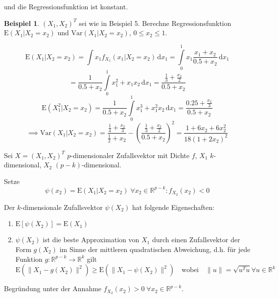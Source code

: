 \documentclass[12pt, a4paper]{article}
\newcommand{\E}{\mbox{I\negthinspace E}}
\theoremstyle{plain}
\theoremstyle{definition}
\newtheorem{beispiel}[thm]{Beispiel}
\newcommand{\R}{\mathbb{R}}
\newcommand{\1}{\mathds{1}}
\renewcommand{\E}{\mathrm{E}}
\newcommand{\Var}{\mathrm{Var}}
\providecommand{\norm}[1]{\lVert#1\rVert}
\renewcommand{\d}{\,\mathrm{d}}
\providecommand{\mtext}[1]{\quad \text{#1} \quad}
\begin{document}
und die Regressionsfunktion ist konstant.

\begin{beispiel}$(X_1, X_2)^T$ sei wie in Beispiel 5. Berechne Regressionsfunktion $\E(X_1 | X_2 = x_2)$ und $\Var(X_1| X_2 = x_2)$, $0 \leq x_2 \leq 1$.\end{beispiel}

\[ \E(X_1|X_2 = x_2) = \int x_1 f_{X_1} (x_1 | X_2 = x_2) \d x_1 = \int\limits_0^1 x_1 \frac{x_1 + x_2}{0.5 + x_2} \d x_1 \]
\[= \frac{1}{0.5 + x_2} \int\limits_0^1 x_1^2 + x_1 x_2 \d x_1 = \frac{\frac{1}{3} + \frac{x_2}{2}}{0.5 + x_2}     \]
\[  \E(X_1^2 | X_2 = x_2) = \frac{1}{0.5 + x_2} \int\limits_0^1 x_1^3 + x_1^2 x_2 \d x_1  = \frac{0.25 + \frac{x_2}{3}}{0.5 + x_2}    \]
\[   \implies \Var(X_1 | X_2 = x_2) = \frac{\frac{1}{4} + \frac{x_2}{3}}{\frac{1}{2} + x_2} - (\frac{\frac{1}{3} + \frac{x_2}{2}}{0.5 + x_2})^2 = \frac{1+ 6x_2 + 6x_2^2}{18(1 + 2x_2)^2} \]




Sei $X = (X_1, X_2)^T$ $p$-dimensionaler Zufallsvektor mit Dichte $f$, $X_1$ $k$-dimensional, $X_2$ $(p-k)$-dimensional.

Setze \[  \psi (x_2) = \E(X_1 | X_2 = x_2) \; \forall x_2 \in \R^{p-k} : f_{X_2} (x_2) < 0     \]

Der $k$-dimensionale Zufallsvektor $\psi (X_2)$ hat folgende Eigenschaften:

\begin{enumerate}

\item $ \E[\psi(X_2)] = \E(X_1)$
\item $ \psi(X_2) $ ist die beste Approximation von $X_1$ durch einen Zufallsvektor der Form $g(X_2)$ im Sinne der mittleren quadratischen Abweichung, d.h. für jede Funktion $g: \R^{p-k} \to \R^k$ gilt
\[  \E (\norm{X_1 - g(X_2)}^2 ) \geq \E (\norm{X_1 - \psi(X_2)}^2 ) \mtext{wobei} \norm{u} = \sqrt{u^T u} \forall u \in \R^k \]
\end{enumerate}
Begründung unter der Annahme $f_{X_2} (x_2) > 0 \; \forall x_2 \in \R^{p-k}$.\\
\end{document}
